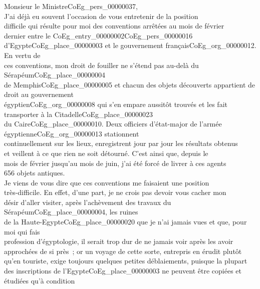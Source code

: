 \documentclass{book}
\begin{document}
\hspace{1cm}Monsieur le Ministre\gls{CoEg_pers_00000037},\\

\indent J’ai déjà eu souvent l’occasion de vous entretenir de la position\\
difficile qui résulte pour moi des conventions arrêtées au mois de février\\
dernier entre le \gls{CoEg_entry_00000002}\gls{CoEg_pers_00000016} d’Egypte\gls{CoEg_place_00000003} et le gouvernement français\gls{CoEg_org_00000012}. En vertu de\\
ces conventions, mon droit de fouiller ne s’étend pas au-delà du Sérapéum\gls{CoEg_place_00000004}\\
de Memphis\gls{CoEg_place_00000005} et chacun des objets découverts appartient de droit au gouvernement\\
égyptien\gls{CoEg_org_00000008} qui s'en empare aussitôt trouvés et les fait transporter à la Citadelle\gls{CoEg_place_00000023}\\
du Caire\gls{CoEg_place_00000010}. Deux officiers d’état-major de l’armée égyptienne\gls{CoEg_org_00000013} stationnent\\
continuellement sur les lieux, enregistrent jour par jour les résultats obtenus\\
et veillent à ce que rien ne soit détourné. C’est ainsi que, depuis le\\
mois de février jusqu’au mois de juin, j’ai été forcé de livrer à ces agents\\
656 objets antiques.\\
\indent Je viens de vous dire que ces conventions me faisaient une position\\
très-difficile. En effet, d’une part, je ne crois pas devoir vous cacher mon\\
désir d’aller visiter, après l’achèvement des travaux du Sérapéum\gls{CoEg_place_00000004}, les ruines\\
de la Haute-Egypte\gls{CoEg_place_00000020} que je n’ai jamais vues et que, pour moi qui fais\\
profession d’égyptologie, il serait trop dur de ne jamais voir après les avoir\\
approchées de si près~; or un voyage de cette sorte, entrepris en érudit plutôt\\
qu’en touriste, exige toujours quelques petites déblaiements, puisque la plupart\\
des inscriptions de l’Egypte\gls{CoEg_place_00000003} ne peuvent être copiées et étudiées qu’à condition\\
\end{document}

